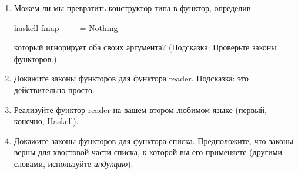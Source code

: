\begin{enumerate}
  \tightlist
  \item
        Можем ли мы превратить конструктор типа  в функтор, определив:

        \begin{snip}{haskell}
fmap _ _ = Nothing
\end{snip}

        который игнорирует оба своих аргумента? (Подсказка: Проверьте законы функторов.)
  \item
        Докажите законы функторов для функтора reader. Подсказка: это действительно просто.
  \item
        Реализуйте функтор reader на вашем втором любимом языке (первый, конечно, Haskell).
  \item
        Докажите законы функторов для функтора списка. Предположите, что законы верны для хвостовой части списка, к которой вы его применяете (другими словами, используйте \emph{индукцию}).
\end{enumerate}